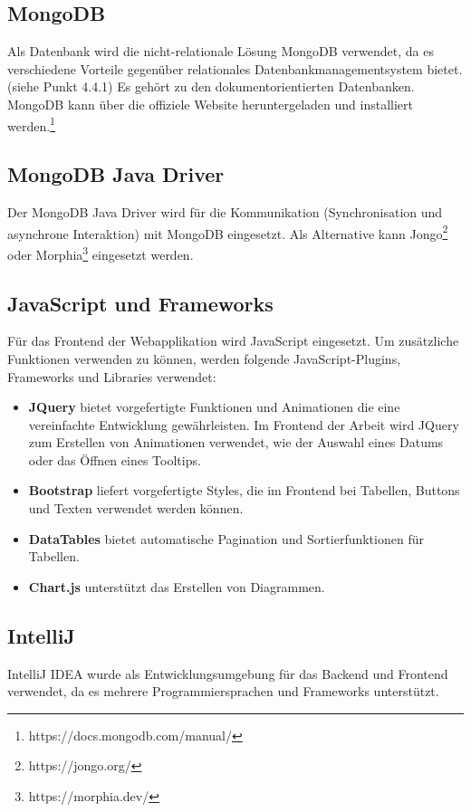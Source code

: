 \subsection{MongoDB} 
Als Datenbank wird die nicht-relationale Lösung MongoDB verwendet, da es verschiedene Vorteile gegenüber relationales Datenbankmanagementsystem bietet. (siehe Punkt 4.4.1) Es gehört zu den dokumentorientierten Datenbanken.
MongoDB kann über die offiziele Website heruntergeladen und installiert werden.\footnote{https://docs.mongodb.com/manual/}

\subsection{MongoDB Java Driver}
Der MongoDB Java Driver wird für die Kommunikation (Synchronisation und asynchrone Interaktion) mit MongoDB eingesetzt. Als Alternative kann Jongo\footnote{https://jongo.org/} oder  Morphia\footnote{https://morphia.dev/} eingesetzt werden. 

\subsection{JavaScript und Frameworks}
Für das Frontend der Webapplikation wird JavaScript eingesetzt. Um zusätzliche Funktionen verwenden zu können, werden folgende JavaScript-Plugins, Frameworks und Libraries verwendet: 
\begin{itemize}
\item \textbf{JQuery} bietet vorgefertigte Funktionen und Animationen die eine vereinfachte Entwicklung gewährleisten. Im Frontend der Arbeit wird JQuery zum Erstellen von Animationen verwendet, wie der Auswahl eines Datums oder das Öffnen eines Tooltips.
\item \textbf{Bootstrap} liefert vorgefertigte Styles, die im Frontend bei Tabellen, Buttons und Texten verwendet werden können.
\item \textbf{DataTables} bietet automatische Pagination und Sortierfunktionen für Tabellen.
\item \textbf{Chart.js} unterstützt das Erstellen von Diagrammen. 
\end{itemize}

\subsection{IntelliJ}
IntelliJ IDEA wurde als Entwicklungsumgebung für das Backend und Frontend verwendet, da es mehrere Programmiersprachen und Frameworks unterstützt.

